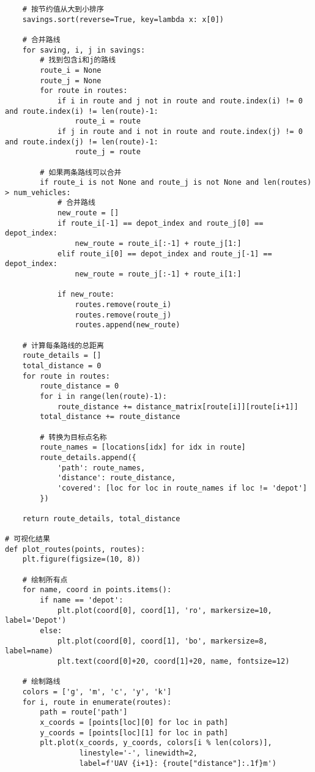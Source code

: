 \documentclass[12pt,fontset=adobe]{ctexart}
\begin{document}
\begin{verbatim}
    # 按节约值从大到小排序
    savings.sort(reverse=True, key=lambda x: x[0])
    
    # 合并路线
    for saving, i, j in savings:
        # 找到包含i和j的路线
        route_i = None
        route_j = None
        for route in routes:
            if i in route and j not in route and route.index(i) != 0 and route.index(i) != len(route)-1:
                route_i = route
            if j in route and i not in route and route.index(j) != 0 and route.index(j) != len(route)-1:
                route_j = route
        
        # 如果两条路线可以合并
        if route_i is not None and route_j is not None and len(routes) > num_vehicles:
            # 合并路线
            new_route = []
            if route_i[-1] == depot_index and route_j[0] == depot_index:
                new_route = route_i[:-1] + route_j[1:]
            elif route_i[0] == depot_index and route_j[-1] == depot_index:
                new_route = route_j[:-1] + route_i[1:]
            
            if new_route:
                routes.remove(route_i)
                routes.remove(route_j)
                routes.append(new_route)
    
    # 计算每条路线的总距离
    route_details = []
    total_distance = 0
    for route in routes:
        route_distance = 0
        for i in range(len(route)-1):
            route_distance += distance_matrix[route[i]][route[i+1]]
        total_distance += route_distance
        
        # 转换为目标点名称
        route_names = [locations[idx] for idx in route]
        route_details.append({
            'path': route_names,
            'distance': route_distance,
            'covered': [loc for loc in route_names if loc != 'depot']
        })
    
    return route_details, total_distance

# 可视化结果
def plot_routes(points, routes):
    plt.figure(figsize=(10, 8))
    
    # 绘制所有点
    for name, coord in points.items():
        if name == 'depot':
            plt.plot(coord[0], coord[1], 'ro', markersize=10, label='Depot')
        else:
            plt.plot(coord[0], coord[1], 'bo', markersize=8, label=name)
            plt.text(coord[0]+20, coord[1]+20, name, fontsize=12)
    
    # 绘制路线
    colors = ['g', 'm', 'c', 'y', 'k']
    for i, route in enumerate(routes):
        path = route['path']
        x_coords = [points[loc][0] for loc in path]
        y_coords = [points[loc][1] for loc in path]
        plt.plot(x_coords, y_coords, colors[i % len(colors)], 
                 linestyle='-', linewidth=2, 
                 label=f'UAV {i+1}: {route["distance"]:.1f}m')
    

\end{verbatim}
\end{document}
